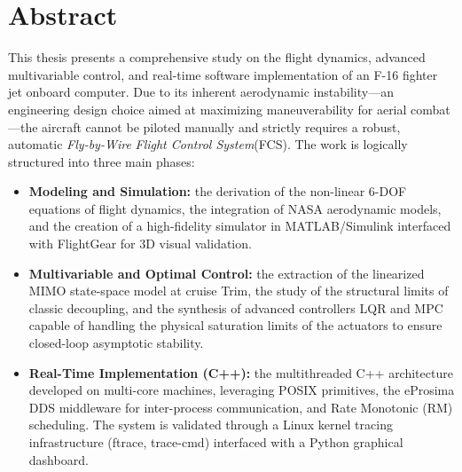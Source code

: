 \cleardoublepage
\listoffigures %

\cleardoublepage
\listoftables %

\cleardoublepage
\chapter*{Abstract}

This thesis presents a comprehensive study on the flight dynamics, advanced multivariable control, and real-time software implementation of an F-16 fighter jet onboard computer. Due to its inherent aerodynamic instability—an engineering design choice aimed at maximizing maneuverability for aerial combat—the aircraft cannot be piloted manually and strictly requires a robust, automatic \textit{Fly-by-Wire}  \textit{Flight Control System}(FCS). The work is logically structured into three main phases:
\begin{itemize}
      \item \textbf{Modeling and Simulation:} the derivation of the non-linear 6-DOF equations of flight dynamics, the integration of NASA aerodynamic models, and the creation of a high-fidelity simulator in MATLAB/Simulink interfaced with FlightGear for 3D visual validation.
  \item \textbf{Multivariable and Optimal Control:} the extraction of the linearized MIMO state-space model at cruise Trim, the study of the structural limits of classic decoupling, and the synthesis of advanced controllers LQR and MPC capable of handling the physical saturation limits of the actuators to ensure closed-loop asymptotic stability.
  \item \textbf{Real-Time Implementation (C++):} the multithreaded C++ architecture developed on multi-core machines, leveraging POSIX primitives, the eProsima DDS middleware for inter-process communication, and Rate Monotonic (RM) scheduling. The system is validated through a Linux kernel tracing infrastructure (ftrace, trace-cmd) interfaced with a Python graphical dashboard.
\end{itemize}

